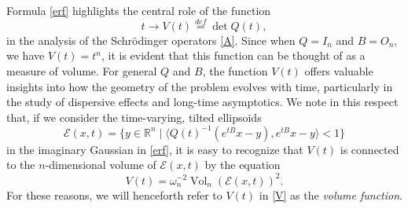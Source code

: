\documentclass[11pt,letter]{amsart}
\newcommand{\Rn}{\mathbb R^n}
\numberwithin{equation}{section}
\numberwithin{equation}{section}
\begin{document}
\noindent Formula \eqref{erf} highlights the central role of the function
\begin{equation}\label{V}
t\longrightarrow V(t) \overset{def}{=} \det Q(t),
\end{equation}
in the analysis of the Schr\"odinger operators \eqref{A}. Since when $Q = I_n$ and $B = O_n$, we have $V(t) = t^n$, it is evident that this function can be thought of as a measure of volume. 
For general $Q$ and $B$, the function $V(t)$ offers valuable insights into how the geometry of the problem evolves with time, particularly in the study of dispersive effects and long-time asymptotics. We note in this respect that, if we consider the time-varying, tilted ellipsoids 
\[
\mathscr E(x,t) = \{y\in \Rn\mid \langle Q(t)^{-1}(e^{tB} x - y),e^{tB} x -y\rangle <  1\}
\]
in the imaginary Gaussian in \eqref{erf},
it is easy to recognize that $V(t)$ is connected to the $n$-dimensional volume of $\mathscr E(x,t)$  by the equation
\begin{equation}\label{vol}
V(t) = \omega_n^{-2} \operatorname{Vol}_n(\mathscr E(x,t))^2.
\end{equation}
For these reasons, we will henceforth refer to $V(t)$ in \eqref{V} as the \emph{volume function}. 

\vskip 0.2in


\end{document}
